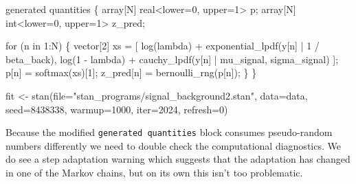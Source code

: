\documentclass[
  letterpaper,
  DIV=11,
  numbers=noendperiod]{scrartcl}
\newenvironment{Shaded}{\begin{snugshade}}{\end{snugshade}}
\newcommand{\AttributeTok}[1]{\textcolor[rgb]{0.40,0.45,0.13}{#1}}
\newcommand{\ControlFlowTok}[1]{\textcolor[rgb]{0.00,0.23,0.31}{#1}}
\newcommand{\DataTypeTok}[1]{\textcolor[rgb]{0.68,0.00,0.00}{#1}}
\newcommand{\DecValTok}[1]{\textcolor[rgb]{0.68,0.00,0.00}{#1}}
\newcommand{\FunctionTok}[1]{\textcolor[rgb]{0.28,0.35,0.67}{#1}}
\newcommand{\KeywordTok}[1]{\textcolor[rgb]{0.00,0.23,0.31}{#1}}
\newcommand{\NormalTok}[1]{\textcolor[rgb]{0.00,0.23,0.31}{#1}}
\newcommand{\OtherTok}[1]{\textcolor[rgb]{0.00,0.23,0.31}{#1}}
\newcommand{\SpecialCharTok}[1]{\textcolor[rgb]{0.37,0.37,0.37}{#1}}
\newcommand{\StringTok}[1]{\textcolor[rgb]{0.13,0.47,0.30}{#1}}
\begin{document}
\begin{codelisting}
\begin{Shaded}
\begin{Highlighting}[]
\KeywordTok{generated quantities}\NormalTok{ \{}
  \DataTypeTok{array}\NormalTok{[N] }\DataTypeTok{real}\NormalTok{\textless{}}\KeywordTok{lower}\NormalTok{=}\DecValTok{0}\NormalTok{, }\KeywordTok{upper}\NormalTok{=}\DecValTok{1}\NormalTok{\textgreater{} p;}
  \DataTypeTok{array}\NormalTok{[N] }\DataTypeTok{int}\NormalTok{\textless{}}\KeywordTok{lower}\NormalTok{=}\DecValTok{0}\NormalTok{, }\KeywordTok{upper}\NormalTok{=}\DecValTok{1}\NormalTok{\textgreater{} z\_pred;}

  \ControlFlowTok{for}\NormalTok{ (n }\ControlFlowTok{in} \DecValTok{1}\NormalTok{:N) \{}
    \DataTypeTok{vector}\NormalTok{[}\DecValTok{2}\NormalTok{] xs = [   log(lambda)}
\NormalTok{                     + exponential\_lpdf(y[n] | }\DecValTok{1}\NormalTok{ / beta\_back),}
\NormalTok{                       log(}\DecValTok{1}\NormalTok{ {-} lambda)}
\NormalTok{                     + cauchy\_lpdf(y[n] | mu\_signal, sigma\_signal) ]\textquotesingle{};}
\NormalTok{    p[n] = softmax(xs)[}\DecValTok{1}\NormalTok{];}
\NormalTok{    z\_pred[n] = bernoulli\_rng(p[n]);}
\NormalTok{  \}}
\NormalTok{\}}
\end{Highlighting}
\end{Shaded}

\end{codelisting}

\begin{Shaded}
\begin{Highlighting}[]
\NormalTok{fit }\OtherTok{\textless{}{-}} \FunctionTok{stan}\NormalTok{(}\AttributeTok{file=}\StringTok{"stan\_programs/signal\_background2.stan"}\NormalTok{,}
            \AttributeTok{data=}\NormalTok{data, }\AttributeTok{seed=}\DecValTok{8438338}\NormalTok{,}
            \AttributeTok{warmup=}\DecValTok{1000}\NormalTok{, }\AttributeTok{iter=}\DecValTok{2024}\NormalTok{, }\AttributeTok{refresh=}\DecValTok{0}\NormalTok{)}
\end{Highlighting}
\end{Shaded}

Because the modified \texttt{generated\ quantities} block consumes
pseudo-random numbers differently we need to double check the
computational diagnostics. We do see a step adaptation warning which
suggests that the adaptation has changed in one of the Markov chains,
but on its own this isn't too problematic.

\begin{Shaded}
\end{Shaded}
\end{document}

